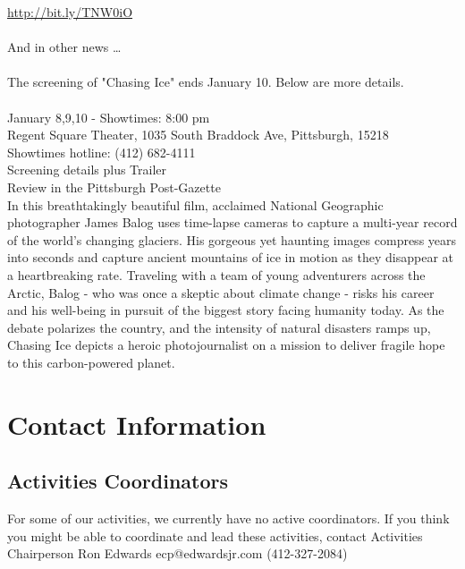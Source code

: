 \documentclass[10pt,a4paper]{article}
\begin{document}
\begin{multicols}{2}
\url{http://bit.ly/TNW0iO}
\\
\\
And in other news \dots
\\
\\
The screening of "Chasing Ice" ends January 10.  Below are more details.
\\
\\
January 8,9,10 - Showtimes: 8:00 pm\\
Regent Square Theater, 1035 South Braddock Ave, Pittsburgh, 15218 \\
Showtimes hotline: (412) 682-4111\\
Screening details plus Trailer\\
Review in the Pittsburgh Post-Gazette\\
In this breathtakingly beautiful film, acclaimed National Geographic photographer James Balog uses time-lapse cameras to capture a multi-year record of the world's changing glaciers. His gorgeous yet haunting images compress years into seconds and capture ancient mountains of ice in motion as they disappear at a heartbreaking rate. Traveling with a team of young adventurers across the Arctic, Balog - who was once a skeptic about climate change - risks his career and his well-being in pursuit of the biggest story facing humanity today. As the debate polarizes the country, and the intensity of natural disasters ramps up, Chasing Ice depicts a heroic photojournalist on a mission to deliver fragile hope to this carbon-powered planet. 


\end{multicols}


\pagebreak
\clearpage

\appendix

\section{Contact Information}

\subsection{Activities Coordinators}
For some of our activities, we currently have no active coordinators. If you think you might be able to coordinate
and lead these activities, contact Activities Chairperson Ron Edwards ecp@edwardsjr.com (412-327-2084)
\end{document}
